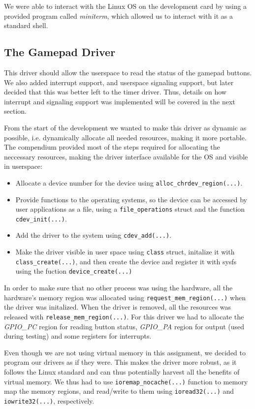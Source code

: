 We were able to interact with the Linux OS on the development card by using a provided program called \textit{miniterm}, which allowed us to interact with it as a standard shell. 

\subsection{The Gamepad Driver}

This driver should allow the userspace to read the status of the gamepad buttons. We also added interrupt support, and userspace signaling support, but later decided that this was better left to the timer driver. Thus, details on how interrupt and signaling support was implemented will be covered in the next section. 

From the start of the development we wanted to make this driver as dynamic as possible, i.e. dynamically allocate all needed resources, making it more portable. The compendium provided most of the steps required for allocating the neccessary resources, making the driver interface available for the OS and visible in userspace:

\begin{itemize}
 \item Allocate a device number for the device using \texttt{alloc\_chrdev\_region(...)}.
 \item Provide functions to the operating systems, so the device can be accessed by user applications as a file, using a \texttt{file\_operations} struct and the function \texttt{cdev\_init(...)}. 
 \item Add the driver to the system using \texttt{cdev\_add(...)}.
 \item Make the driver visible in user space using \texttt{class} struct, initalize it with \texttt{class\_create(...)}, and then create the device and register it with sysfs using the fuction \texttt{device\_create(...)}
\end{itemize}

In order to make sure that no other process was using the hardware, all the hardware's memory region was allocated using \texttt{request\_mem\_region(...)} when the driver was initalized. When the driver is removed, all the resources was released with \texttt{release\_mem\_region(...)}. For this driver we had to allocate the \textit{GPIO\_PC} region for reading button status, \textit{GPIO\_PA} region for output (used during testing) and some registers for interrupts. 

Even though we are not using virtual memory in this assignment, we decided to program our drivers as if they were. This makes the driver more robust, as it follows the Linux standard and can thus potentially harvest all the benefits of virtual memory. We thus had to use \texttt{ioremap\_nocache(...)} function to memory map the memory regions, and read/write to them using \texttt{ioread32(...)} and \texttt{iowrite32(...)}, respectively.

